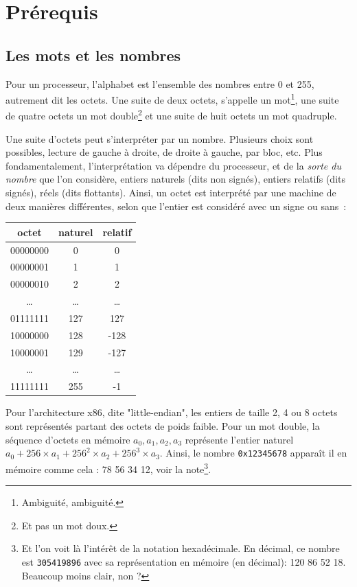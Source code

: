 \documentclass{book}
\newcommand{\code}[1]{\texttt{#1}}
\begin{document}
	

\chapter{Prérequis}

\section{Les mots et les nombres}

Pour un processeur, l'alphabet est l'ensemble des nombres entre 0 et 255, autrement dit les octets.
Une suite de deux octets, s'appelle un mot\footnote{Ambiguité, ambiguité.}, une suite de quatre octets un mot double\footnote{Et pas un mot doux.} et une suite de huit octets un mot quadruple.

Une suite d'octets peut s'interpréter par un nombre. Plusieurs choix sont possibles, lecture de gauche à droite, de droite à gauche, par bloc, etc. Plus fondamentalement, l'interprétation va dépendre du processeur, et de la \emph{sorte du nombre} que l'on considère, entiers naturels (dits non signés), entiers relatifs (dits signés), réels (dits flottants).  Ainsi, un octet est interprété par une machine de deux manières différentes, selon que l'entier est considéré avec un signe ou sans~: 

\begin{center}
	\begin{tabular}{| c | c | c |}
		\hline
		octet & naturel & relatif\\
		\hline
		00000000 & 0 & 0\\
		\hline 00000001 & 1 & 1\\
		\hline 00000010 & 2 & 2\\
		\hline \ldots & \ldots & \ldots\\
		\hline 01111111 & 127 & 127\\
		\hline 10000000 & 128 & -128\\
		\hline 10000001 & 129 & -127\\
		\hline \ldots& \ldots & \ldots\\
		\hline 11111111 & 255 & -1\\
		\hline
	\end{tabular}
\end{center}

Pour l'architecture {\sc x86}, dite "little-endian", les entiers de taille 2, 4 ou 8 octets sont représentés partant des octets de poids faible. Pour un mot double, la séquence d'octets en mémoire $a_0, a_1, a_2, a_3$ représente l'entier naturel $a_0 + 256 \times a_1 + 256^2 \times a_2 + 256^3 \times a_3$. Ainsi, le nombre \code{0x12345678} apparaît il en mémoire comme cela : 
78 56 34 12, voir la note\footnote{Et l'on voit là l'intérêt de la notation hexadécimale. En décimal, ce nombre est \code{305419896} avec sa représentation en mémoire (en décimal): 120 86 52 18. Beaucoup moins clair, non ? }.
\end{document}

